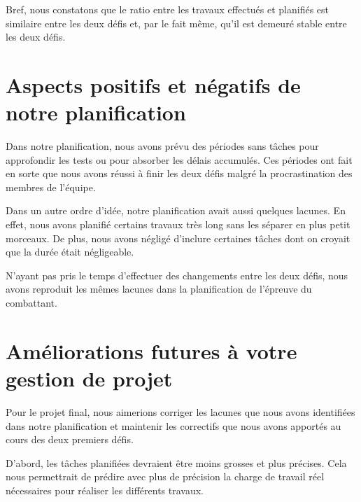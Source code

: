 \begin{spacing}{1.5}
    Bref, nous constatons que le ratio entre les travaux effectués et planifiés est similaire entre les deux défis et, par le fait même, qu'il est demeuré stable entre les deux défis.
\end{spacing}

\pagebreak

\section{Aspects positifs et négatifs de notre planification}

\begin{spacing}{1.5}
    Dans notre planification, nous avons prévu des périodes sans tâches pour approfondir les tests ou pour absorber les délais accumulés.
    Ces périodes ont fait en sorte que nous avons réussi à finir les deux défis malgré la procrastination des membres de l'équipe.
\end{spacing}

\begin{spacing}{1.5}
    Dans un autre ordre d'idée, notre planification avait aussi quelques lacunes.
    En effet, nous avons planifié certains travaux très long sans les séparer en plus petit morceaux.
    De plus, nous avons négligé d'inclure certaines tâches dont on croyait que la durée était négligeable.
\end{spacing}

\begin{spacing}{1.5}
    N'ayant pas pris le temps d'effectuer des changements entre les deux défis, nous avons reproduit les mêmes lacunes dans la planification de l'épreuve du combattant.
\end{spacing}

\section{Améliorations futures à votre gestion de projet}

\begin{spacing}{1.5}
    Pour le projet final, nous aimerions corriger les lacunes que nous avons identifiées dans notre planification et maintenir les correctifs que nous avons apportés au cours des deux premiers défis.
\end{spacing}

\begin{spacing}{1.5}
    D'abord, les tâches planifiées devraient être moins grosses et plus précises.
    Cela nous permettrait de prédire avec plus de précision la charge de travail réel nécessaires pour réaliser les différents travaux.
\end{spacing}

